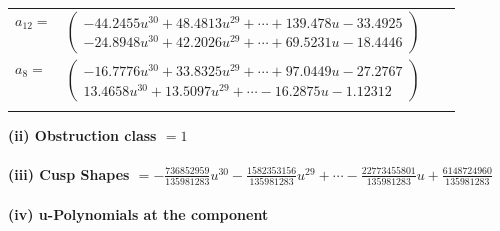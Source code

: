 \documentclass[1p]{elsarticle_modified}
\theoremstyle{definition}
\begin{document}
\begin{tabular}{m{7pt} m{180pt} m{7pt} m{180pt} }
\flushright $a_{12}=$&$\begin{pmatrix}-44.2455 u^{30}+48.4813 u^{29}+\cdots+139.478 u-33.4925\\-24.8948 u^{30}+42.2026 u^{29}+\cdots+69.5231 u-18.4446\end{pmatrix}$ \\
\flushright $a_{8}=$&$\begin{pmatrix}-16.7776 u^{30}+33.8325 u^{29}+\cdots+97.0449 u-27.2767\\13.4658 u^{30}+13.5097 u^{29}+\cdots-16.2875 u-1.12312\end{pmatrix}$\\&\end{tabular}
\flushleft \textbf{(ii) Obstruction class $= 1$}\\~\\
\flushleft \textbf{(iii) Cusp Shapes $= -\frac{736852959}{135981283} u^{30}-\frac{1582353156}{135981283} u^{29}+\cdots-\frac{22773455801}{135981283} u+\frac{6148724960}{135981283}$}\\~\\
\newpage\renewcommand{\arraystretch}{1}
\flushleft \textbf{(iv) u-Polynomials at the component}\newline \\
\end{document}
